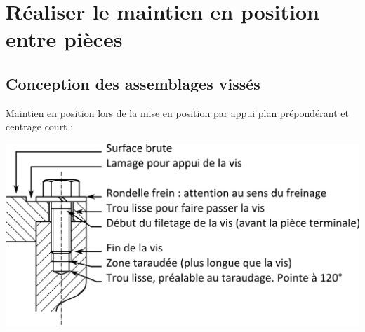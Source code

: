 \documentclass[11pt,oneside]{article}
\begin{document}
%
\section{Réaliser le maintien en position entre pièces}
\subsection{Conception des assemblages vissés}
Maintien en position lors de la mise en position par appui plan prépondérant et centrage court :

\begin{center}
\includegraphics[width=.8\textwidth]{png/Fig30_1}
\end{center}
\end{document}
